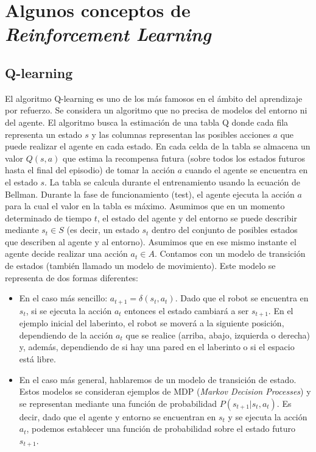 \documentclass{article}
\begin{document}
\section{Algunos conceptos de \textit{Reinforcement Learning}}

\subsection{Q-learning}
El algoritmo Q-learning es uno de los más famosos en el ámbito del aprendizaje por refuerzo. Se considera un algoritmo que no precisa de modelos del entorno ni del agente. El algoritmo busca la estimación de una tabla Q donde cada fila representa un estado $s$ y las columnas representan las posibles acciones $a$ que puede realizar el agente en cada estado. En cada celda de la tabla se almacena un valor $Q(s, a)$ que estima la recompensa futura (sobre todos los estados futuros hasta el final del episodio) de tomar la acción $a$ cuando el agente se encuentra en el estado $s$. La tabla se calcula durante el entrenamiento usando la ecuación de Bellman. Durante la fase de funcionamiento (test), el agente ejecuta la acción $a$ para la cual el valor en la tabla es máximo.
Asumimos que en un momento determinado de tiempo $t$, el estado del agente y del entorno se puede describir mediante $s_t \in S$ (es decir, un estado $s_t$ dentro del conjunto de posibles estados que describen al agente y al entorno). Asumimos que en ese mismo instante el agente decide realizar una acción $a_t \in A$. Contamos con un modelo de transición de estados (también llamado un modelo de movimiento). Este modelo se representa de dos formas diferentes:
\begin{itemize}
    \item En el caso más sencillo: $a_{t+1}=\delta(s_t, a_t)$. Dado que el robot se encuentra en $s_t$, si se ejecuta la acción $a_t$ entonces el estado cambiará a ser $s_{t+1}$. En el ejemplo inicial del laberinto, el robot se moverá a la siguiente posición, dependiendo de la acción $a_t$ que se realice (arriba, abajo, izquierda o derecha) y, además, dependiendo de si hay una pared en el laberinto o si el espacio está libre.
    \item En el caso más general, hablaremos de un modelo de transición de estado. Estos modelos se consideran ejemplos de MDP (\emph{Markov Decision Processes}) y se representan mediante una función de probabilidad
    $P(s_{t+1}|s_t, a_t)$. Es decir, dado que el agente y entorno se encuentran en $s_t$ y se ejecuta la acción $a_t$, podemos establecer una función de probabilidad sobre el estado futuro $s_{t+1}$.
\end{itemize} 
\end{document}
